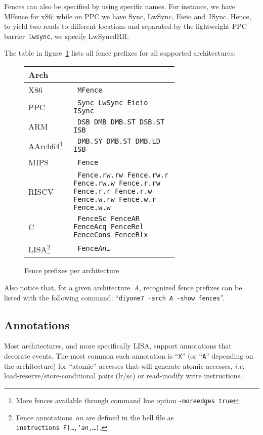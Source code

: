 Fences can also be specified by using specific names.
For instance, we have  MFence for x86;
while on PPC we have Sync, LwSync, Eieio and~ISync.
Hence, to yield two reads to different locations
and separated by the lightweight PPC barrier~\texttt{lwsync},
we specify LwSyncdRR.

The table in figure~\ref{fence:relax:fig} lists all fence prefixes
for all supported architectures:
\begin{figure}[h]
\caption{\label{fence:relax:fig}Fence prefixes per architecture}
\begin{center}
\begin{minipage}{0.9\linewidth}
\begin{center}
\begin{tabular}{l>{\tt}p{0.7\linewidth}}
Arch & \multicolumn{1}{c}{Fence prefixes} \\ \hline
X86 & MFence \\
PPC & Sync LwSync Eieio ISync \\
ARM & DSB DMB DMB.ST DSB.ST ISB \\
AArch64\footnote{More fences available through command line option \texttt{-moreedges true}}\qquad\qquad & DMB.SY DMB.ST DMB.LD ISB \\
MIPS & Fence \\
RISCV & Fence.rw.rw Fence.rw.r Fence.rw.w  Fence.r.rw Fence.r.r Fence.r.w
Fence.w.rw Fence.w.r Fence.w.w\\
C & FenceSc FenceAR FenceAcq FenceRel FenceCons FenceRlx\\
LISA\footnote{Fence annotations~\emph{an} are defined in the bell file as
\texttt{instructions~F[{\ldots,'\emph{an},\ldots}]}.}
 & Fence\emph{An}\ldots\\
\end{tabular}
\end{center}
\end{minipage}
\end{center}
\end{figure}
Also notice that, for a given architecture~\emph{A},
recognized fence prefixes can be listed with the following command:
``\texttt{diyone7 -arch \emph{A} -show fences}''.

\subsection{Annotations}

Most architectures, and more specifically LISA, support annotations that
decorate events. The most common such annotation is ``\texttt{X}'' (or ``\texttt{A}'' depending on the architecture)
for ``atomic'' accesses that will generate atomic accesses, \emph{i.e.}
load-reserve/store-conditional pairs (lr/sc) or read-modify write instructions.

